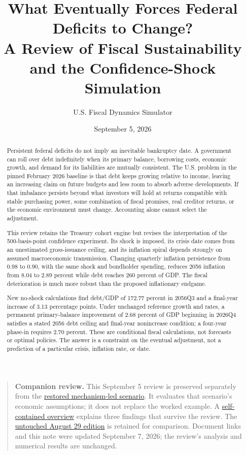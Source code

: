 \documentclass[11pt]{article}
\title{What Eventually Forces Federal Deficits to Change?\\
\large A Review of Fiscal Sustainability and the Confidence-Shock Simulation}
\author{U.S. Fiscal Dynamics Simulator}
\date{September 5, 2026}
\begin{document}
\maketitle

\begin{quote}
\small
\textbf{Companion review.} This September 5 review is preserved separately from
the \href{confidence_shock_household_scenario.pdf}{restored mechanism-led scenario}.
It evaluates that scenario's economic assumptions; it does not replace the worked
example. A \href{continuing_to_borrow.pdf}{self-contained overview} explains three
findings that survive the review. The
\href{confidence_shock_household_scenario_2026-08-29.pdf}{untouched August 29 edition}
is retained for comparison. Document links and this note were updated September 7, 2026;
the review's analysis and numerical results are unchanged.
\end{quote}

\begin{abstract}
Persistent federal deficits do not imply an inevitable bankruptcy date. A government can
roll over debt indefinitely when its primary balance, borrowing costs, economic growth,
and demand for its liabilities are mutually consistent. The U.S. problem in the pinned
February 2026 baseline is that debt keeps growing relative to income, leaving an increasing
claim on future budgets and less room to absorb adverse developments. If that imbalance
persists beyond what investors will hold at returns compatible with stable purchasing
power, some combination of fiscal promises, real creditor returns, or the economic
environment must change. Accounting alone cannot select the adjustment.

This review retains the Treasury cohort engine but revises the interpretation of the
500-basis-point confidence experiment. Its shock is imposed, its crisis date comes from an
unestimated gross-issuance ceiling, and its inflation spiral depends strongly on assumed
macroeconomic transmission. Changing quarterly inflation persistence from 0.98 to 0.90,
with the same shock and bondholder spending, reduces 2056 inflation from 8.04 to 2.89 percent
while debt reaches 260 percent of GDP. The fiscal deterioration is much more robust than
the proposed inflationary endgame.

New no-shock calculations find debt/GDP of 172.77 percent in 2056Q3 and a final-year increase
of 3.13 percentage points. Under unchanged reference growth and rates, a permanent
primary-balance improvement of 2.68 percent of GDP beginning in 2026Q4 satisfies a stated
2056 debt ceiling and final-year nonincrease condition; a four-year phase-in requires
2.70 percent. These are conditional fiscal calculations, not forecasts or optimal policies.
The answer is a constraint on the eventual adjustment, not a prediction of a particular
crisis, inflation rate, or date.
\end{abstract}
\end{document}
